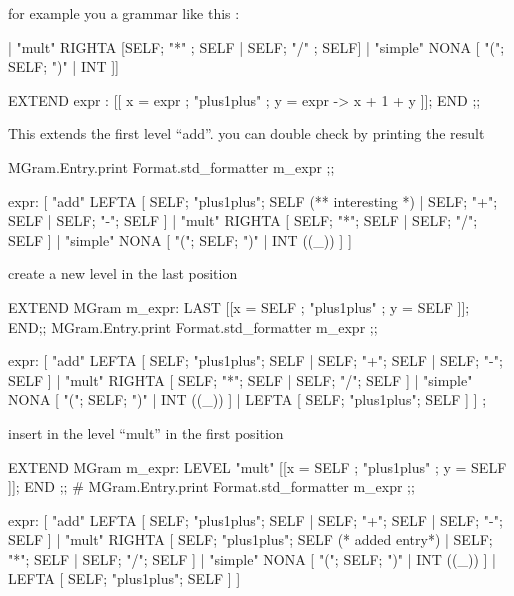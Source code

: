 \begin{enumerate}
\begin{enumerate}[(a)]
\begin{itemize}
for example you a grammar like this : 

\begin{bluecode}
    ["add" LEFTA
    [SELF; "+" ; SELF | SELF; "-" ; SELF]
    | "mult" RIGHTA
    [SELF; "*" ; SELF | SELF; "/" ; SELF]
    | "simple" NONA
    [ "("; SELF; ")"  | INT ]]   
\end{bluecode}

  \begin{bluecode}
EXTEND expr : [[ x = expr ; "plus1plus" ; y = expr -> x + 1 + y ]];
END ;;    
\end{bluecode}
This extends the first level  ``add''. you can double check by printing
the result 

\begin{redcode}
MGram.Entry.print Format.std_formatter m_expr ;;
\end{redcode}

\begin{bluecode}  
expr: [ "add" LEFTA
  [ SELF; "plus1plus"; SELF (** interesting *)
  | SELF; "+"; SELF
  | SELF; "-"; SELF ]
| "mult" RIGHTA
  [ SELF; "*"; SELF
  | SELF; "/"; SELF ]
| "simple" NONA
  [ "("; SELF; ")"
  | INT ((_)) ] ]  
\end{bluecode}

create a new level in the last position 
\begin{redcode}
EXTEND MGram  m_expr: LAST [[x = SELF ; "plus1plus" ; y = SELF ]]; END;;
MGram.Entry.print Format.std_formatter m_expr ;;
\end{redcode}

\begin{bluecode}
expr: [ "add" LEFTA
  [ SELF; "plus1plus"; SELF
  | SELF; "+"; SELF
  | SELF; "-"; SELF ]
| "mult" RIGHTA
  [ SELF; "*"; SELF
  | SELF; "/"; SELF ]
| "simple" NONA
  [ "("; SELF; ")"
  | INT ((_)) ]
| LEFTA
[ SELF; "plus1plus"; SELF ] ] ; 
\end{bluecode}

insert in the level ``mult'' in the first position 
\begin{redcode}
EXTEND MGram  m_expr: LEVEL "mult" [[x = SELF ; "plus1plus" ; y = SELF ]]; END ;;
# MGram.Entry.print Format.std_formatter m_expr ;;
\end{redcode}

\begin{bluecode}
expr: [ "add" LEFTA
  [ SELF; "plus1plus"; SELF
  | SELF; "+"; SELF
  | SELF; "-"; SELF ]
| "mult" RIGHTA
  [ SELF; "plus1plus"; SELF (* added entry*)
  | SELF; "*"; SELF
  | SELF; "/"; SELF ]
| "simple" NONA
  [ "("; SELF; ")"
  | INT ((_)) ]
| LEFTA
  [ SELF; "plus1plus"; SELF ] ]  
\end{bluecode}


\end{itemize}
\end{enumerate}
\end{enumerate}
